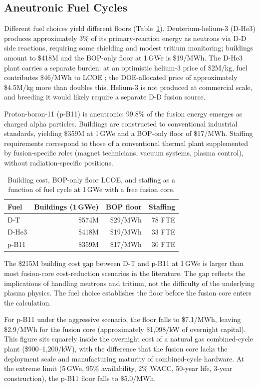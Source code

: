 \documentclass{article}
\begin{document}
\subsection{Aneutronic Fuel Cycles}
\label{sec:aneutronic}

Different fuel choices yield different floors
(Table~\ref{tab:fuels}). Deuterium-helium-3 (D-He3) produces
approximately 3\% of its primary-reaction energy as neutrons via
D-D side reactions, requiring some shielding and modest tritium
monitoring; buildings amount to \$418M and the BOP-only floor at
1\,GWe is \$19/MWh. The D-He3 plant carries a separate burden:
at an optimistic helium-3 price of \$2M/kg, fuel contributes
\$46/MWh to LCOE \citep{Shea2010}; the DOE-allocated price of
approximately \$4.5M/kg more than doubles this. Helium-3 is not
produced at commercial scale, and breeding it would likely require
a separate D-D fusion source.

Proton-boron-11 (p-B11) is aneutronic: 99.8\% of the
fusion energy emerges as charged alpha particles.
Buildings are constructed to conventional industrial standards,
yielding \$359M at 1\,GWe and a BOP-only floor of \$17/MWh.
Staffing requirements correspond to those of a conventional thermal
plant supplemented by fusion-specific roles (magnet technicians,
vacuum systems, plasma control), without radiation-specific
positions.

\begin{table}[htbp]
\caption{Building cost, BOP-only floor LCOE, and staffing as a
function of fuel cycle at 1\,GWe with a free fusion core.}
\label{tab:fuels}
\centering
\begin{tabular}{lrrr}
\toprule
Fuel & Buildings (1\,GWe) & BOP floor & Staffing \\
\midrule
D-T & \$574M & \$29/MWh & 78 FTE \\
D-He3 & \$418M & \$19/MWh & 33 FTE \\
p-B11 & \$359M & \$17/MWh & 30 FTE \\
\bottomrule
\end{tabular}
\end{table}

The \$215M building cost gap between D-T and p-B11 at 1\,GWe is
larger than most fusion-core cost-reduction scenarios in the
literature. The gap reflects the implications of handling neutrons
and tritium, not the difficulty of the underlying plasma physics.
The fuel choice establishes the floor before the fusion core enters
the calculation.

For p-B11 under the aggressive scenario, the floor falls to
\$7.1/MWh, leaving \$2.9/MWh for the fusion core (approximately
\$1{,}098/kW of overnight capital). This figure sits squarely
inside the overnight cost of a natural gas combined-cycle plant
(\$900--1{,}200/kW), with the difference that the fusion core
lacks the deployment scale and manufacturing maturity of
combined-cycle hardware. At the extreme limit (5\,GWe, 95\%
availability, 2\% WACC, 50-year life, 3-year construction), the
p-B11 floor falls to \$5.0/MWh.
\end{document}
